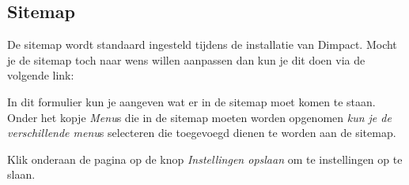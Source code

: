 \subsection{Sitemap}\label{sitemap}
De sitemap wordt standaard ingesteld tijdens de installatie van Dimpact. Mocht je de sitemap toch naar wens willen aanpassen dan kun je dit doen via de volgende link: 

In dit formulier kun je aangeven wat er in de sitemap moet komen te staan. Onder het kopje \emph{Menu}s die in de sitemap moeten worden opgenomen\emph{ kun je de verschillende menu}s selecteren die toegevoegd dienen te worden aan de sitemap.

Klik onderaan de pagina op de knop \emph{Instellingen opslaan} om te instellingen op te slaan.